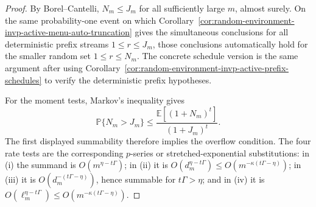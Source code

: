 \documentclass[11pt]{amsart}
\numberwithin{equation}{section}
\theoremstyle{definition}
\theoremstyle{remark}
\newcommand{\Prob}{\mathbb P}
\newcommand{\Exp}{\mathbb E}
\begin{document}
\begin{proof}
By Borel--Cantelli, \(N_m\le J_m\) for all sufficiently large \(m\), almost
surely.  On the same probability-one event on which
Corollary~\ref{cor:random-environment-invp-active-menu-auto-truncation} gives
the simultaneous conclusions for all deterministic prefix streams
\(1\le r\le J_m\), those conclusions automatically hold for the smaller random
set \(1\le r\le N_m\).  The concrete schedule version is the same argument after
using Corollary~\ref{cor:random-environment-invp-active-prefix-schedules} to
verify the deterministic prefix hypotheses.

For the moment tests, Markov's inequality gives
\[
  \Prob\{N_m>J_m\}
  \le
  \frac{\Exp[(1+N_m)^t]}{(1+J_m)^t}.
\]
The first displayed summability therefore implies the overflow condition.  The
four rate tests are the corresponding \(p\)-series or stretched-exponential
substitutions: in \textup{(i)} the summand is \(O(m^{\eta-t\Gamma})\); in
\textup{(ii)} it is \(O(d_m^{\eta-t\Gamma})\le
O(m^{-\kappa(t\Gamma-\eta)})\); in \textup{(iii)} it is
\(O(d_m^{-(t\Gamma-\eta)})\), hence summable for \(t\Gamma>\eta\); and in
\textup{(iv)} it is \(O(\ell_m^{\eta-t\Gamma})\le
O(m^{-\kappa(t\Gamma-\eta)})\).
\end{proof}
\end{document}
